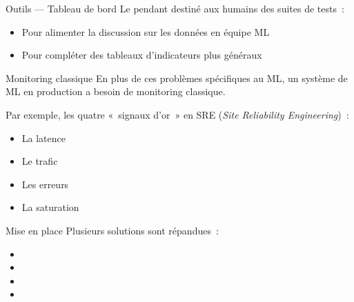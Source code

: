 \begin{frame}{Outils — Tableau de bord}
  Le pendant destiné aux humains des suites de tests~:

  \begin{itemize}
    \item Pour alimenter la discussion sur les données en équipe ML
    \item Pour compléter des tableaux d'indicateurs plus généraux
  \end{itemize}
\end{frame}

\begin{frame}{Monitoring classique}
  En plus de ces problèmes spécifiques au ML, un système de ML en production a besoin de monitoring classique.

  Par exemple, les quatre «~signaux d'or~» en SRE (\textit{Site Reliability Engineering})~:

  \begin{itemize}
    \item La latence
    \item Le trafic
    \item Les erreurs
    \item La saturation
  \end{itemize}
\end{frame}

\begin{frame}{Mise en place}
  Plusieurs solutions sont répandues~:

  \begin{itemize}
    \item {}
    \item {}
    \item {}
    \item {}
  \end{itemize}
\end{frame}
